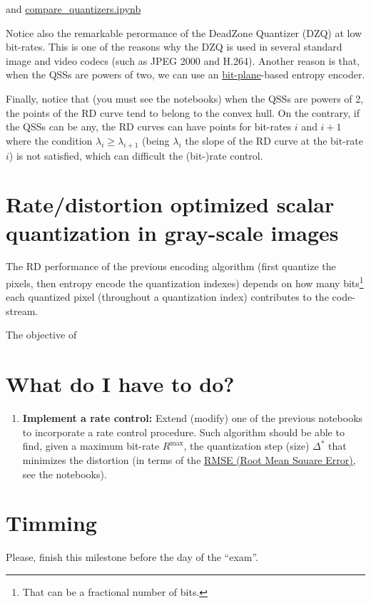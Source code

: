 and
\href{https://github.com/Sistemas-Multimedia/Sistemas-Multimedia.github.io/blob/master/contents/gray_SQ/compare_quantizers.ipynb}{compare\_quantizers.ipynb}


Notice also the remarkable perormance of the DeadZone Quantizer (DZQ)
at low bit-rates. This is one of the reasons why the DZQ is used in
several standard image and video codecs (such as JPEG 2000 and
H.264). Another reason is that, when the QSSs are powers of two, we
can use an
\href{https://en.wikipedia.org/wiki/Bit_plane}{bit-plane}-based
entropy encoder.

Finally, notice that (you must see the notebooks) when the QSSs are
powers of 2, the points of the RD curve tend to belong to the convex
hull. On the contrary, if the QSSs can be any, the RD curves can have
points for bit-rates $i$ and $i+1$ where the condition
$\lambda_i\ge\lambda_{i+1}$ (being $\lambda_i$ the slope of the RD
curve at the bit-rate $i$) is not satisfied, which can difficult the
(bit-)rate control.

\section{Rate/distortion optimized scalar quantization in gray-scale images}
The RD performance of the previous encoding algorithm (first quantize
the pixels, then entropy encode the quantization indexes) depends on
how many bits\footnote{That can be a fractional number of bits.} each
quantized pixel (throughout a quantization index) contributes to the
code-stream.

The objective of 

\section{What do I have to do?}
\begin{enumerate}
\item \textbf{Implement a rate control:} Extend (modify) one of the
  previous notebooks to incorporate a rate control procedure. Such
  algorithm should be able to find, given a maximum bit-rate
  $R^\text{max}$, the quantization step (size) $\Delta^*$ that
  minimizes the distortion (in terms of the
  \href{https://en.wikipedia.org/wiki/Root-mean-square_deviation}{RMSE
    (Root Mean Square Error)}, see the notebooks).
\end{enumerate}

\section{Timming}
Please, finish this milestone before the day of the ``exam''.

